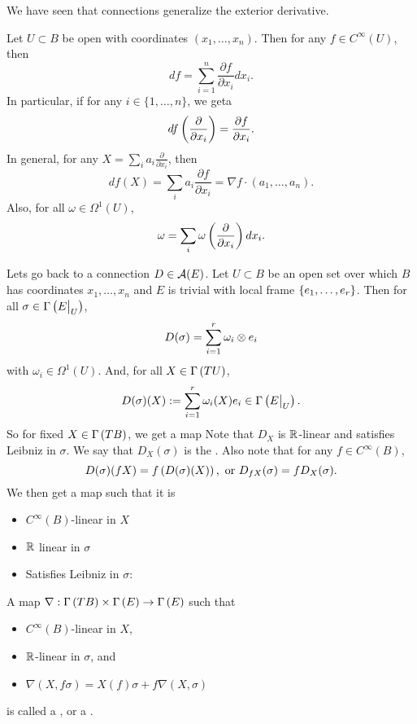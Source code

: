 \documentclass[main.tex]{subfiles}
\begin{document}
We have seen that connections generalize the exterior derivative.

 Let $U \subset B$ be open with coordinates $(x_1, \dots, x_n)$. Then for any $f \in C^\infty(U)$, then 
\[
df = \sum_{i=1}^n \frac{\partial f}{\partial x_i} dx_i.
\]
In particular, if for any $i \in \{1, \dots, n\}$, we geta
\[
df \left( \frac{\partial}{\partial x_i} \right) = \frac{\partial f}{\partial x_i}.
\]
In general, for any $X = \sum_{i} a_i \frac{\partial}{\partial x_i}$, then 
\[
df(X) = \sum_i a_i \frac{\partial f}{\partial x_i} = \nabla f \cdot (a_1, \dots, a_n). 
\]
Also, for all $\omega \in \Omega^1(U)$, 
\[
\omega = \sum_i \omega\left( \frac{\partial}{\partial x_i} \right) dx_i.
\]

Lets go back to a connection $D \in \mathcal{A}(E)$. Let $U \subset B$ be an open set over which $B$ has coordinates $x_1, \dots, x_n$ and $E$ is trivial with local frame $\left\{e_1, \dots, e_r\right\}$. Then for all $\sigma \in \Gamma\left( E\big|_{U} \right)$, 
\[
D(\sigma) = \sum_{i=1}^r \omega_i \otimes e_i
\]
with $\omega_i \in \Omega^1(U)$. And, for all $X \in \Gamma\left( TU \right)$,
\[
D(\sigma)(X) := \sum_{i=1}^r \omega_i(X) e_i \in \Gamma\left( E\big|_{U} \right).
\] So for fixed $X \in \Gamma\left( TB \right)$, we get a map
Note that $D_X$ is $\mathbb{R}$-linear and satisfies Leibniz in $\sigma$. We say that $D_X(\sigma)$ is the . Also note that for any $f \in C^\infty(B)$, 
\[
D(\sigma)(fX) = f\left(  D(\sigma)(X)  \right), \text{ or } D_{fX}(\sigma) = f D_X(\sigma).
\]
We then get a map
such that it is 
\begin{itemize}
    \item $C^\infty(B)$-linear in $X$ 
    \item $\mathbb{R}$ linear in $\sigma$
    \item Satisfies Leibniz in $\sigma$:
\end{itemize}

\begin{defn}
A map $\nabla: \Gamma\left( TB \right)\times\Gamma\left( E \right) \to \Gamma\left( E \right) $ such that
\begin{itemize}
    \item $C^\infty(B)$-linear in $X$,
    \item $\mathbb{R}$-linear in $\sigma$, and
    \item $\nabla(X, f\sigma) = X(f)\sigma + f\nabla(X , \sigma)$
\end{itemize} is called a , or a .
\end{defn}
\end{document}
